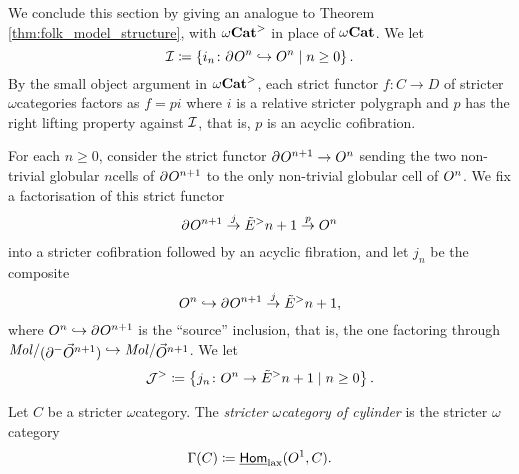 \noindent We conclude this section by giving an analogue to Theorem \ref{thm:folk_model_structure}, with \( {\omega\mathbf{Cat}}^> \) in place of \( {\omega\mathbf{Cat}} \).
We let 
\begin{equation*}
    \mathcal{I} \coloneqq \left\{ {i_n \colon \partial_{}^{} O^{n} \hookrightarrow O^{n} \mid n \geq 0} \right\}.
\end{equation*}
By the small object argument in \( {\omega\mathbf{Cat}}^> \), each strict functor \( f \colon C \to D \) of stricter \( \omega \)\nbd categories factors as \( f = p i \) where \( i \) is a relative stricter polygraph and \( p \) has the right lifting property against \( \mathcal{I} \), that is, \( p \) is an acyclic cofibration.

\begin{dfn} \label{dfn:generating_folk_acyclic_cof}
    For each \( n \geq 0 \), consider the strict functor \( \partial_{}^{} O^{n + 1} \to O^{n} \) sending the two non-trivial globular \( n \)\nbd cells of \( \partial_{}^{} O^{n + 1} \) to the only non-trivial globular cell of \( O^{n} \).
    We fix a factorisation of this strict functor
    \begin{equation*}
        \partial_{}^{} O^{n + 1} \stackrel{j}{\to} \tilde E^>{n + 1} \stackrel{p}{\to} O^{n}
    \end{equation*}
    into a stricter cofibration followed by an acyclic fibration, and let \( j_n \) be the composite
    \begin{equation*}
        O^{n} \hookrightarrow \partial_{}^{} O^{n + 1} \stackrel{j}{\to} \tilde E^>{n + 1},
    \end{equation*}
    where \( O^{n} \hookrightarrow \partial_{}^{} O^{n + 1} \) is the ``source'' inclusion, that is, the one factoring through \( \molecin{(\bd{}{-}\dglobe{n + 1})} \incl \molecin{\dglobe{n + 1}} \).
    We let
    \begin{equation*}
        \mathcal{J}^> \coloneqq \left\{ {j_n \colon O^{n} \to \tilde E^>{n + 1} \mid n \geq 0} \right\}.
    \end{equation*} 
\end{dfn}

\begin{dfn} 
    Let \( C \) be a stricter \( \omega \)\nbd category.
    The \emph{stricter \( \omega \)\nbd category of cylinder} is the stricter \( \omega \)\nbd category 
    \begin{equation*}
       \Gamma(C) \coloneqq \underline{\mathsf{Hom}}_{\mathrm{lax}}(O^{1}, C). 
    \end{equation*}
\end{dfn}

